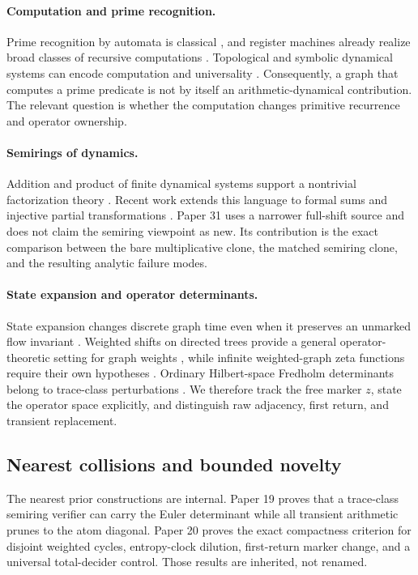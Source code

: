 \paragraph{Computation and prime recognition.}
Prime recognition by automata is classical \citep{HartmanisShank1968}, and
register machines already realize broad classes of recursive computations
\citep{ShepherdsonSturgis1963}.  Topological and symbolic dynamical systems can
encode computation and universality \citep{Kurka1997,DelvenneKurkaBlondel2006}.
Consequently, a graph that computes a prime predicate is not by itself an
arithmetic-dynamical contribution.  The relevant question is whether the
computation changes primitive recurrence and operator ownership.

\paragraph{Semirings of dynamics.}
Addition and product of finite dynamical systems support a nontrivial
factorization theory \citep{NaquinGadouleau2024}.  Recent work extends this
language to formal sums and injective partial transformations
\citep{GadouleauJohnson2026}.  Paper 31 uses a narrower full-shift source and
does not claim the semiring viewpoint as new.  Its contribution is the exact
comparison between the bare multiplicative clone, the matched semiring clone,
and the resulting analytic failure modes.

\paragraph{State expansion and operator determinants.}
State expansion changes discrete graph time even when it preserves an
unmarked flow invariant \citep{ParrySullivan1975}.  Weighted shifts on
directed trees provide a general operator-theoretic setting for graph weights
\citep{JablonskiJungStochel2012}, while infinite weighted-graph zeta functions
require their own hypotheses \citep{Deitmar2015}.  Ordinary Hilbert-space
Fredholm determinants belong to trace-class perturbations
\citep{Simon1977}.  We therefore track the free marker $z$, state the operator
space explicitly, and distinguish raw adjacency, first return, and transient
replacement.

\subsection{Nearest collisions and bounded novelty}

The nearest prior constructions are internal.  Paper 19 proves that a
trace-class semiring verifier can carry the Euler determinant while all
transient arithmetic prunes to the atom diagonal.  Paper 20 proves the exact
compactness criterion for disjoint weighted cycles, entropy-clock dilution,
first-return marker change, and a universal total-decider control.  Those
results are inherited, not renamed.

